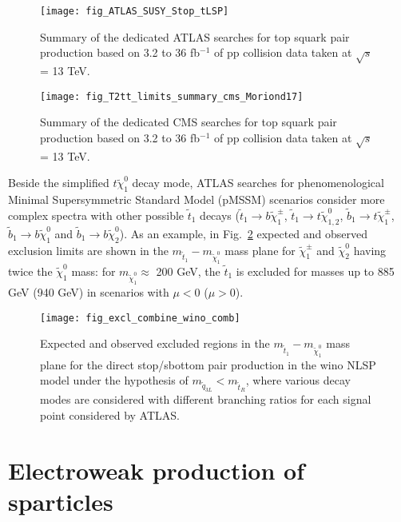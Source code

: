 \documentclass{ws-ijmpcs}
\begin{document}
\begin{figure}[!tbp]
  \centering
  \begin{minipage}[b]{0.45\textwidth}
    \texttt{[image: fig\_ATLAS\_SUSY\_Stop\_tLSP]}
    \caption{Summary of the dedicated ATLAS searches for top squark pair production based on 3.2 to 36 fb$^{-1}$ of pp collision data taken at $\sqrt{s}$ = 13 TeV. \label{ATLAS3rd}}
  \end{minipage}
  \hfill
  \begin{minipage}[b]{0.45\textwidth}
    \texttt{[image: fig\_T2tt\_limits\_summary\_cms\_Moriond17]}
    \caption{Summary of the dedicated CMS searches for top squark pair production based on 3.2 to 36 fb$^{-1}$ of pp collision data taken at $\sqrt{s}$ = 13 TeV. \label{CMS3rd}}
  \end{minipage}
\end{figure}

Beside the simplified $t \tilde{\chi}^0_1$ decay mode, ATLAS searches for phenomenological Minimal Supersymmetric Standard Model (pMSSM) scenarios consider more complex spectra \cite{ATLAS_pMSSM} with other possible $\tilde{t}_1$ decays ($\tilde{t}_1 \rightarrow b \tilde{\chi}^\pm_1$, $\tilde{t}_1 \rightarrow t \tilde{\chi}^0_{1,2}$, $\tilde{b}_1 \rightarrow t \tilde{\chi}^\pm_1$, $\tilde{b}_1 \rightarrow b \tilde{\chi}^0_1$ and $\tilde{b}_1 \rightarrow b \tilde{\chi}^0_2$). As an example, in Fig.~\ref{ATLASpMSSM} expected and observed exclusion limits are shown in the $m_{\tilde{t}_1} - m_{\tilde{\chi}^0_1}$ mass plane for $\tilde{\chi}^\pm_1$ and $\tilde{\chi}^0_2$ having twice the $\tilde{\chi}^0_1$ mass: for $m_{\tilde{\chi}^0_1} \approx$ 200 GeV, the $\tilde{t}_1$ is excluded for masses up to 885 GeV (940 GeV) in scenarios with $\mu < 0$ ($\mu > 0$).

\begin{figure}[pb]
\centerline{\texttt{[image: fig\_excl\_combine\_wino\_comb]}}
\vspace*{8pt}
\caption{Expected and observed excluded regions in the $m_{\tilde{t}_1} - m_{\tilde{\chi}^0_1}$ mass plane for the direct stop/sbottom pair production in the wino NLSP model under the hypothesis of $m_{\tilde{q}_{3L}} < m_{\tilde{t}_R}$, where various decay modes are considered with different branching ratios for each signal point considered by ATLAS.\label{ATLASpMSSM}}
\end{figure}

\section{Electroweak production of sparticles}
\end{document}
